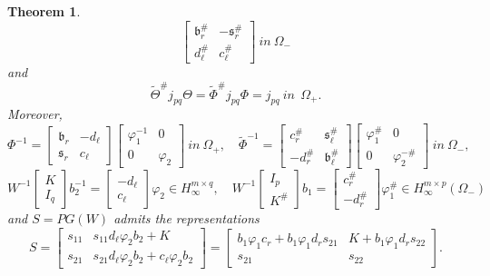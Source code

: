 \documentclass[12pt,twoside,a4paper]{amsart}
\newtheorem{thm}{Theorem}[section]
\theoremstyle{definition}
\numberwithin{equation}{section}
\begin{document}
\begin{thm}
\begin{equation}
\begin{bmatrix}{{\mathfrak b}}_r^\#&-{{\mathfrak s}}_r^\#\\ d_\ell^\#&c_\ell^\#\end{bmatrix} \ in
\ \Omega_-
\end{equation}
and
\begin{equation}
\label{eq:may13d9}
\widetilde{\Theta}^\#j_{pq}\Theta=\widetilde{\Phi}^\#j_{pq}\Phi=j_{pq}\ in\ \
\Omega_+.
\end{equation}
Moreover,
\begin{equation}
\label{eq:jun1d8}
\Phi^{-1}=\begin{bmatrix}{{\mathfrak b}}_r&-d_\ell\\ {{\mathfrak s}}_r&c_\ell\end{bmatrix}
\begin{bmatrix}\varphi_1^{-1}&0\\0&\varphi_2\end{bmatrix}\ in \ \Omega_+,\quad
{{{\widetilde {\Phi}} }}^{-1}=\begin{bmatrix}c_r^\#&{{\mathfrak s}}_\ell^\#\\ -d_r^\#&{{\mathfrak b}}_\ell^\#
\end{bmatrix}
\begin{bmatrix}\varphi_1^{\#}&0\\0&\varphi_2^{-\#}\end{bmatrix}\ in\
\Omega_-,
\end{equation}
\begin{equation}\label{eq:11.30}
W^{-1}\begin{bmatrix}
  K \\ I_q
\end{bmatrix}
b_2^{-1}=\begin{bmatrix}-d_\ell\\ c_\ell\end{bmatrix}\varphi_2
\in H_\infty^{m\times q},
\quad
W^{-1}\begin{bmatrix}
  I_p \\ K^\#
\end{bmatrix}b_1=\begin{bmatrix}c_r^\#\\ -d_r^\#\end{bmatrix}\varphi_1^\#
\in H_\infty^{m\times p}(\Omega_-)
\end{equation}
and
$S=PG(W)$ admits the representations
\begin{equation}
\label{eq:11.41}
S=\begin{bmatrix}s_{11}& s_{11}d_\ell\varphi_2b_2+K\\ s_{21}&s_{21}
d_\ell\varphi_2b_2+c_\ell\varphi_2b_2
\end{bmatrix}=\begin{bmatrix}b_1\varphi_1c_r+b_1\varphi_1d_rs_{21}
&K+b_1\varphi_1d_rs_{22}\\s_{21}& s_{22}\end{bmatrix}.
\end{equation}
\end{thm}
\end{document}
